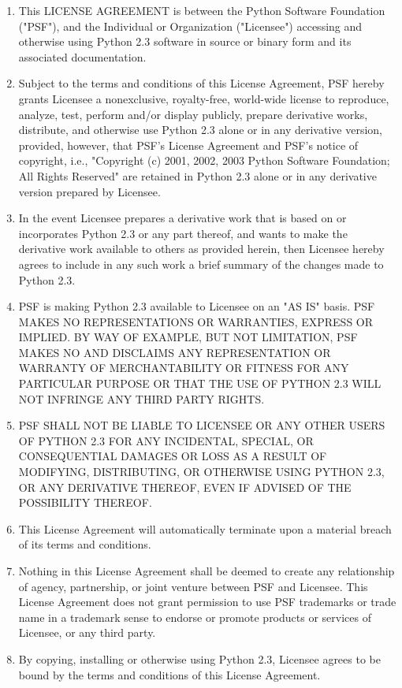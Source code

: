 \begin{enumerate}
\item This LICENSE AGREEMENT is between the Python Software Foundation
("PSF"), and the Individual or Organization ("Licensee") accessing and
otherwise using Python 2.3 software in source or binary form and its
associated documentation.

\item Subject to the terms and conditions of this License Agreement, PSF
hereby grants Licensee a nonexclusive, royalty-free, world-wide
license to reproduce, analyze, test, perform and/or display publicly,
prepare derivative works, distribute, and otherwise use Python 2.3
alone or in any derivative version, provided, however, that PSF's
License Agreement and PSF's notice of copyright, i.e., "Copyright (c)
2001, 2002, 2003 Python Software Foundation; All Rights Reserved" are
retained in Python 2.3 alone or in any derivative version prepared by
Licensee.

\item In the event Licensee prepares a derivative work that is based on
or incorporates Python 2.3 or any part thereof, and wants to make
the derivative work available to others as provided herein, then
Licensee hereby agrees to include in any such work a brief summary of
the changes made to Python 2.3.

\item PSF is making Python 2.3 available to Licensee on an "AS IS"
basis.  PSF MAKES NO REPRESENTATIONS OR WARRANTIES, EXPRESS OR
IMPLIED.  BY WAY OF EXAMPLE, BUT NOT LIMITATION, PSF MAKES NO AND
DISCLAIMS ANY REPRESENTATION OR WARRANTY OF MERCHANTABILITY OR FITNESS
FOR ANY PARTICULAR PURPOSE OR THAT THE USE OF PYTHON 2.3 WILL NOT
INFRINGE ANY THIRD PARTY RIGHTS.

\item PSF SHALL NOT BE LIABLE TO LICENSEE OR ANY OTHER USERS OF PYTHON
2.3 FOR ANY INCIDENTAL, SPECIAL, OR CONSEQUENTIAL DAMAGES OR LOSS AS
A RESULT OF MODIFYING, DISTRIBUTING, OR OTHERWISE USING PYTHON 2.3,
OR ANY DERIVATIVE THEREOF, EVEN IF ADVISED OF THE POSSIBILITY THEREOF.

\item This License Agreement will automatically terminate upon a material
breach of its terms and conditions.

\item Nothing in this License Agreement shall be deemed to create any
relationship of agency, partnership, or joint venture between PSF and
Licensee.  This License Agreement does not grant permission to use PSF
trademarks or trade name in a trademark sense to endorse or promote
products or services of Licensee, or any third party.

\item By copying, installing or otherwise using Python 2.3, Licensee
agrees to be bound by the terms and conditions of this License
Agreement.
\end{enumerate}


